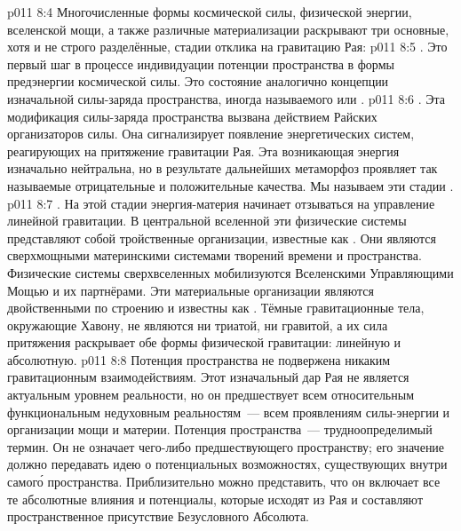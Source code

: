 \vs p011 8:4 \pc Многочисленные формы космической силы, физической энергии, вселенской мощи, а также различные материализации раскрывают три основные, хотя и не строго разделённые, стадии отклика на гравитацию Рая:
\vs p011 8:5 . Это первый шаг в процессе индивидуации потенции пространства в формы предэнергии космической силы. Это состояние аналогично концепции изначальной силы\hyp{}заряда пространства, иногда называемого  или .
\vs p011 8:6 . Эта модификация силы\hyp{}заряда пространства вызвана действием Райских организаторов силы. Она сигнализирует появление энергетических систем, реагирующих на притяжение гравитации Рая. Эта возникающая энергия изначально нейтральна, но в результате дальнейших метаморфоз проявляет так называемые отрицательные и положительные качества. Мы называем эти стадии .
\vs p011 8:7 . На этой стадии энергия\hyp{}материя начинает отзываться на управление линейной гравитации. В центральной вселенной эти физические системы представляют собой тройственные организации, известные как . Они являются сверхмощными материнскими системами творений времени и пространства. Физические системы сверхвселенных мобилизуются Вселенскими Управляющими Мощью и их партнёрами. Эти материальные организации являются двойственными по строению и известны как . Тёмные гравитационные тела, окружающие Хавону, не являются ни триатой, ни гравитой, а их сила притяжения раскрывает обе формы физической гравитации: линейную и абсолютную.
\vs p011 8:8 \pc Потенция пространства не подвержена никаким гравитационным взаимодействиям. Этот изначальный дар Рая не является актуальным уровнем реальности, но он предшествует всем относительным функциональным недуховным реальностям~--- всем проявлениям силы\hyp{}энергии и организации мощи и материи. Потенция пространства~--- трудноопределимый термин. Он не означает чего\hyp{}либо предшествующего пространству; его значение должно передавать идею о потенциальных возможностях, существующих внутри самог\'о пространства. Приблизительно можно представить, что он включает все те абсолютные влияния и потенциалы, которые исходят из Рая и составляют пространственное присутствие Безусловного Абсолюта.
